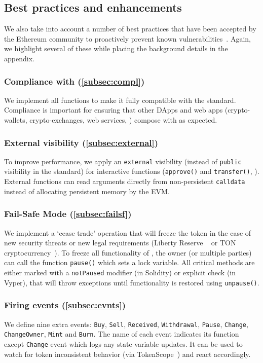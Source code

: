 \subsection{Best practices and enhancements}
We also take into account a number of best practices that have been accepted by the Ethereum community to proactively prevent known vulnerabilities~\cite{TokenBP}. Again, we highlight several of these while placing the background details in the appendix.

\subsubsection{Compliance with \erc (\ref{subsec:compl})}
We implement all \erc functions to make it fully compatible with the standard. Compliance is important for ensuring that other DApps and web apps (\ie crypto-wallets, crypto-exchanges, web services, \etc) compose with \sys as expected. 

\subsubsection{External visibility (\ref{subsec:external})}
To improve performance, we apply an \texttt{external} visibility (instead of \texttt{public} visibility in the standard) for interactive functions (\eg \texttt{approve()} and \texttt{transfer()}, \etc).  External functions can read arguments directly from non-persistent \texttt{calldata} instead of allocating persistent memory by the EVM. 

\subsubsection{Fail-Safe Mode (\ref{subsec:failsf})}
We implement a `cease trade' operation that will freeze the token in the case of new security threats or new legal requirements (\eg Liberty Reserve ~\cite{LibertyReserve} or TON cryptocurrency~\cite{TON}). To freeze all functionality of \sys, the owner (or multiple parties) can call the function \texttt{pause()} which sets a lock variable. All critical methods are either marked with a \texttt{notPaused} modifier (in Solidity) or explicit check (in Vyper), that will throw exceptions until functionality is restored using \texttt{unpause()}. 

\subsubsection{Firing events (\ref{subsec:evnts})}
We define nine extra events: \texttt{Buy}, \texttt{Sell}, \texttt{Received}, \texttt{Withdrawal}, \texttt{Pause}, \texttt{Change}, \texttt{ChangeOwner}, \texttt{Mint} and \texttt{Burn}. The name of each event indicates its function except \texttt{Change} event which logs any state variable updates. It can be used to watch for token inconsistent behavior (\eg via TokenScope~\cite{TokenScope}) and react accordingly. 
	
